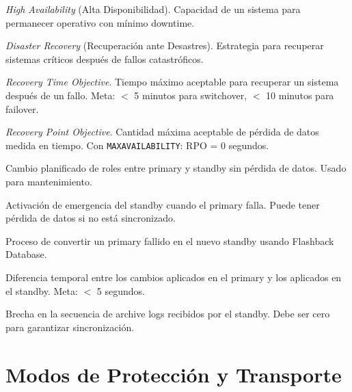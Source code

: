 \documentclass[11pt, a4paper]{report}
\begin{document}
\begin{description}[style=nextline, leftmargin=3cm, font=\normalfont\bfseries]
    \item[HA] \textit{High Availability} (Alta Disponibilidad). Capacidad de un sistema para permanecer operativo con mínimo downtime.

    \item[DR] \textit{Disaster Recovery} (Recuperación ante Desastres). Estrategia para recuperar sistemas críticos después de fallos catastróficos.

    \item[RTO] \textit{Recovery Time Objective}. Tiempo máximo aceptable para recuperar un sistema después de un fallo. Meta: $<$ 5 minutos para switchover, $<$ 10 minutos para failover.

    \item[RPO] \textit{Recovery Point Objective}. Cantidad máxima aceptable de pérdida de datos medida en tiempo. Con \texttt{MAXAVAILABILITY}: RPO = 0 segundos.

    \item[Switchover] Cambio planificado de roles entre primary y standby sin pérdida de datos. Usado para mantenimiento.

    \item[Failover] Activación de emergencia del standby cuando el primary falla. Puede tener pérdida de datos si no está sincronizado.

    \item[Reinstatement] Proceso de convertir un primary fallido en el nuevo standby usando Flashback Database.

    \item[Apply Lag] Diferencia temporal entre los cambios aplicados en el primary y los aplicados en el standby. Meta: $<$ 5 segundos.

    \item[Archive Gap] Brecha en la secuencia de archive logs recibidos por el standby. Debe ser cero para garantizar sincronización.
\end{description}

\section{Modos de Protección y Transporte}
\end{document}
